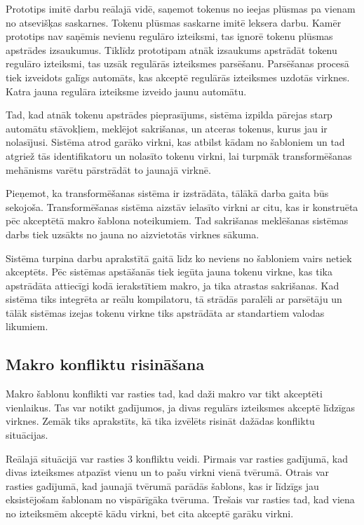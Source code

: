 Prototips imitē darbu reālajā vidē, saņemot tokenus no ieejas plūsmas pa vienam no atsevišķas saskarnes. Tokenu plūsmas saskarne imitē leksera darbu. Kamēr prototips nav saņēmis nevienu regulāro izteiksmi, tas ignorē tokenu plūsmas apstrādes izsaukumus. Tiklīdz prototipam atnāk izsaukums apstrādāt tokenu regulāro izteiksmi, tas uzsāk regulārās izteiksmes parsēšanu. Parsēšanas procesā tiek izveidots galīgs automāts, kas akceptē regulārās izteiksmes uzdotās virknes. Katra jauna regulāra izteiksme izveido jaunu automātu.

Tad, kad atnāk tokenu apstrādes pieprasījums, sistēma izpilda pārejas starp automātu stāvokļiem, meklējot sakrišanas, un atceras tokenus, kurus jau ir nolasījusi. Sistēma atrod garāko virkni, kas atbilst kādam no šabloniem un tad atgriež tās identifikatoru un nolasīto tokenu virkni, lai turpmāk transformēšanas mehānisms varētu pārstrādāt to jaunajā virknē.

Pieņemot, ka transformēšanas sistēma ir izstrādāta, tālākā darba gaita būs sekojoša. Transformēšanas sistēma aizstāv ielasīto virkni ar citu, kas ir konstruēta pēc akceptētā makro šablona noteikumiem. Tad sakrišanas meklēšanas sistēmas darbs tiek uzsākts no jauna no aizvietotās virknes sākuma.

Sistēma turpina darbu aprakstītā gaitā līdz ko neviens no šabloniem vairs netiek akceptēts. Pēc sistēmas apstāšanās tiek iegūta jauna tokenu virkne, kas tika apstrādāta attiecīgi kodā ierakstītiem makro, ja tika atrastas sakrišanas. Kad sistēma tiks integrēta ar reālu kompilatoru, tā strādās paralēli ar parsētāju un tālāk sistēmas izejas tokenu virkne tiks apstrādāta ar standartiem valodas likumiem.

\subsection{\label{sbs:prot_conflictresolving}Makro konfliktu risināšana}
Makro šablonu konflikti var rasties tad, kad daži makro var tikt akceptēti vienlaikus. Tas var notikt gadījumos, ja divas regulārs izteiksmes akceptē līdzīgas virknes. Zemāk tiks aprakstīts, kā tika izvēlēts risināt dažādas konfliktu situācijas. 

Reālajā situācijā var rasties 3 konfliktu veidi. Pirmais var rasties gadījumā, kad divas izteiksmes atpazīst vienu un to pašu virkni vienā tvērumā. Otrais var rasties gadījumā, kad jaunajā tvērumā parādās šablons, kas ir līdzīgs jau eksistējošam šablonam no vispārīgāka tvēruma. Trešais var rasties tad, kad viena no izteiksmēm akceptē kādu virkni, bet cita akceptē garāku virkni.

